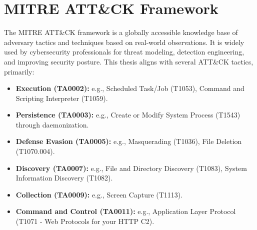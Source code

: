 \section{MITRE ATT\&CK Framework}
\label{sec:mitre_attack}
The MITRE ATT\&CK\textsuperscript{\textregistered} framework is a globally accessible knowledge base of adversary tactics and techniques based on real-world observations. It is widely used by cybersecurity professionals for threat modeling, detection engineering, and improving security posture. This thesis aligns with several ATT\&CK tactics, primarily:
\begin{itemize}
    \item \textbf{Execution (TA0002):} e.g., Scheduled Task/Job (T1053), Command and Scripting Interpreter (T1059).
    \item \textbf{Persistence (TA0003):} e.g., Create or Modify System Process (T1543) through daemonization.
    \item \textbf{Defense Evasion (TA0005):} e.g., Masquerading (T1036), File Deletion (T1070.004).
    \item \textbf{Discovery (TA0007):} e.g., File and Directory Discovery (T1083), System Information Discovery (T1082).
    \item \textbf{Collection (TA0009):} e.g., Screen Capture (T1113).
    \item \textbf{Command and Control (TA0011):} e.g., Application Layer Protocol (T1071 - Web Protocols for your HTTP C2).
\end{itemize}
